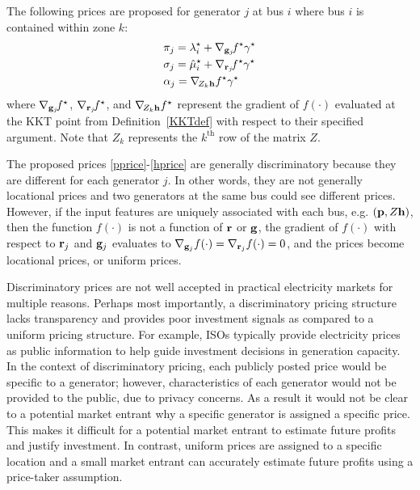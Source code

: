 \documentclass[lettersize,journal]{IEEEtran}
\begin{document}
The following prices are proposed for generator $j$ at bus $i$ where bus $i$ is contained within zone $k$:
\begin{subequations}
\begin{align}
&\pi_j= \lambda_i^{\star}+\nabla_{\bold{g}_j}\!f^{\star} \gamma^{\star}\label{pprice}\\
&\sigma_j= \hat{\mu}_i^{\star}+\nabla_{\bold{r}_j}\!f^{\star} \gamma^{\star}\label{qprice}\\
&\alpha_j= \nabla_{\!Z_k \bold{h}} f^{\star} \gamma^{\star}\label{hprice}
\end{align}\end{subequations}
where $\nabla_{\bold{g}_j}\!f^{\star}$, $\nabla_{\bold{r}_j}\!f^{\star}$, and $\nabla_{\!Z_k \bold{h}} f^{\star}$ represent the gradient of $f(\cdot)$ evaluated at the KKT point from Definition~\ref{KKTdef} with respect to their specified argument.  Note that $Z_k$ represents the $k^{\text{th}}$ row of the matrix $Z$.

The proposed prices \eqref{pprice}-\eqref{hprice} are generally discriminatory because they are different for each generator $j$.  In other words, they are not generally locational prices and two generators at the same bus could see different prices.  However, if the input features are uniquely associated with each bus, e.g. $(\bold{p},Z\bold{h})$, then the function $f(\cdot)$ is not a function of $\bold{r}$ or $\bold{g}$, the gradient of $f(\cdot)$ with respect to $\bold{r}_j$ and $\bold{g}_j$ evaluates to $\nabla_{\bold{g}_j} f(\cdot)=\nabla_{\bold{r}_j} f(\cdot)=0$, and the prices become locational prices, or uniform prices.

Discriminatory prices are not well accepted in practical electricity markets for multiple reasons.  Perhaps most importantly, a discriminatory pricing structure lacks transparency and provides poor investment signals as compared to a uniform pricing structure.  For example, ISOs typically provide electricity prices as public information to help guide investment decisions in generation capacity.  In the context of discriminatory pricing, each publicly posted price would be specific to a generator; however, characteristics of each generator would not be provided to the public, due to privacy concerns.  As a result it would not be clear to a potential market entrant why a specific generator is assigned a specific price.  This makes it difficult for a potential market entrant to estimate future profits and justify investment.  In contrast, uniform prices are assigned to a specific location and a small market entrant can accurately estimate future profits using a price-taker assumption.
\end{document}
